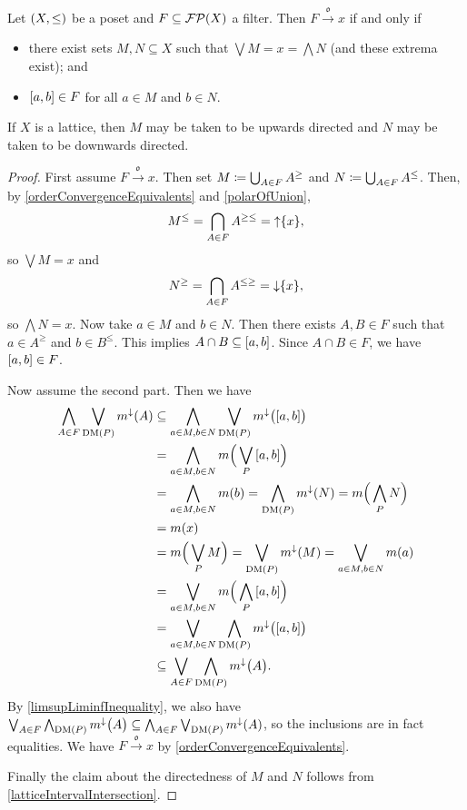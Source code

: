 \begin{proposition} \label{orderConvergenceIntervalBase}
Let $\sSet{X,\leq}$ be a poset and $F\subseteq \operatorname{\mathcal{FP}}(X)$ a filter. Then $F\overset{\mathfrak{o}}{\longrightarrow} x$ \textup{if and only if}
\begin{itemize}
\item there exist sets $M,N\subseteq X$ such that $\bigvee M = x = \bigwedge N$ (and these extrema exist); and
\item $\interval{a,b}\in F$ for all $a\in M$ and $b\in N$.
\end{itemize}
If $X$ is a lattice, then $M$ may be taken to be upwards directed and $N$ may be taken to be downwards directed.
\end{proposition}
\begin{proof}
First assume $F\overset{\mathfrak{o}}{\longrightarrow} x$. Then set $M \coloneqq \bigcup_{A\in F}A^\geq$ and $N \coloneqq \bigcup_{A\in F}A^\leq$. Then, by \ref{orderConvergenceEquivalents} and \ref{polarOfUnion},
\[ M^\leq = \bigcap_{A\in F}A^{\geq\leq} = \operatorname{\uparrow}\{x\}, \]
so $\bigvee M = x$ and
\[ N^\geq = \bigcap_{A\in F}A^{\leq\geq} = \operatorname{\downarrow}\{x\}, \]
so $\bigwedge N = x$. Now take $a\in M$ and $b\in N$. Then there exists $A,B\in F$ such that $a\in A^\geq$ and $b\in B^\leq$. This implies $A\cap B \subseteq \interval{a,b}$. Since $A\cap B\in F$, we have $\interval{a,b}\in F$.

Now assume the second part. Then we have
\begin{align*}
\bigwedge_{A\in F}\bigvee_{\DM(P)} m^\imf(A) &\subseteq \bigwedge_{a\in M, b\in N}\bigvee_{\DM(P)} m^\imf\big(\interval{a,b}\big) \\
&= \bigwedge_{a\in M, b\in N} m\Big(\bigvee_{P}\interval{a,b}\Big) \\
&= \bigwedge_{a\in M, b\in N} m(b) = \bigwedge_{\DM(P)} m^\imf(N) = m\Big(\bigwedge_P N\Big) \\
&= m(x) \\
&= m\Big(\bigvee_P M\Big) = \bigvee_{\DM(P)} m^\imf(M) = \bigvee_{a\in M, b\in N} m(a) \\
&= \bigvee_{a\in M, b\in N} m\Big(\bigwedge_{P}\interval{a,b}\Big) \\
&= \bigvee_{a\in M, b\in N}\bigwedge_{\DM(P)} m^\imf\big(\interval{a,b}\big) \\
&\subseteq \bigvee_{A\in F}\bigwedge_{\DM(P)} m^\imf\big(A\big).
\end{align*}
By \ref{limsupLiminfInequality}, we also have $\bigvee_{A\in F}\bigwedge_{\operatorname{DM}(P)} m^\downarrow\big(A\big) \subseteq \bigwedge_{A\in F}\bigvee_{\operatorname{DM}(P)} m^\downarrow(A)$, so the inclusions are in fact equalities. We have $F\overset{\mathfrak{o}}{\longrightarrow} x$ by \ref{orderConvergenceEquivalents}.

Finally the claim about the directedness of $M$ and $N$ follows from \ref{latticeIntervalIntersection}.
\end{proof}

